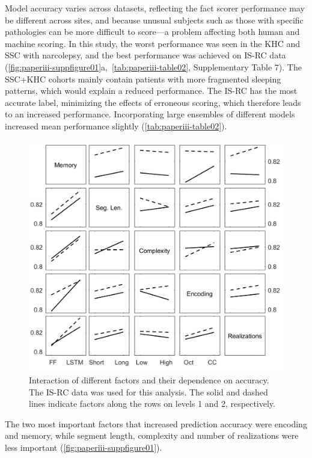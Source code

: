 Model accuracy varies across datasets, reflecting the fact scorer performance may be different across sites, and because unusual subjects such as those with specific pathologies can be more difficult to score—a problem affecting both human and machine scoring. 
In this study, the worst performance was seen in the KHC and SSC with narcolepsy, and the best performance was achieved on IS-RC data (\cref{fig:paperiii-suppfigure01}a,~\cref{tab:paperiii-table02}, Supplementary Table 7).
The SSC+KHC cohorts mainly contain patients with more fragmented sleeping patterns, which would explain a reduced performance. 
The IS-RC has the most accurate label, minimizing the effects of erroneous scoring, which therefore leads to an increased performance.
Incorporating large ensembles of different models increased mean performance slightly (\cref{tab:paperiii-table02}).
\begin{figure}
    \centering
    \includegraphics[width=\textwidth]{figures/paper-iii/SuppFigure_2.png}
    \caption[Interaction of different factors and their dependence on accuracy.]{Interaction of different factors and their dependence on accuracy. The IS-RC data was used for this analysis. The solid and dashed lines indicate factors along the rows on levels 1 and 2, respectively.}
    \label{fig:paperiii-suppfigure02}
\end{figure}
The two most important factors that increased prediction accuracy were encoding and memory, while segment length, complexity and number of realizations were less important (\cref{fig:paperiii-suppfigure01}).
